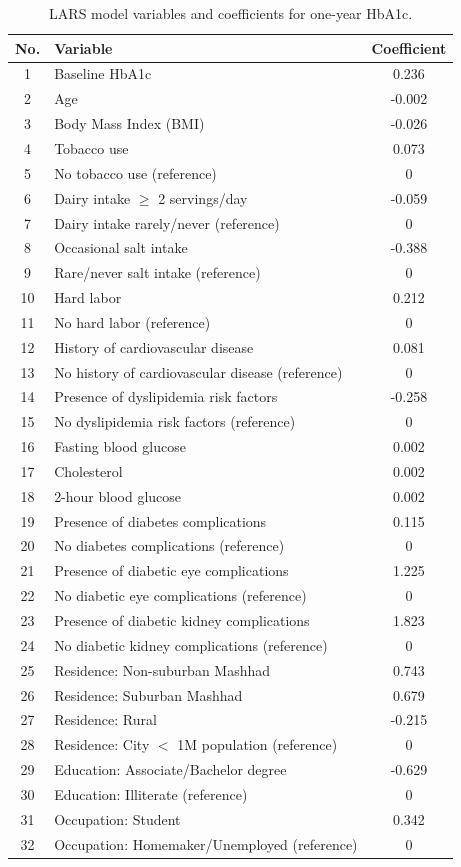 \documentclass[twoside]{article}
\begin{document}
\begin{table}[h]
\begin{center}
\small
\caption{LARS model variables and coefficients for one-year HbA1c.}\label{tab2}

\begin{tabular}{|c|l|c|}
  \hline
  No. & Variable & Coefficient \\  \hline \hline
  1 & Baseline HbA1c & 0.236 \\
  2 & Age & -0.002 \\
  3 & Body Mass Index (BMI) & -0.026 \\
  4 & Tobacco use & 0.073 \\
  5 & No tobacco use (reference) & 0 \\
  6 & Dairy intake $\geq$ 2 servings/day & -0.059 \\
  7 & Dairy intake rarely/never (reference) & 0 \\
  8 & Occasional salt intake & -0.388 \\
  9 & Rare/never salt intake (reference) & 0 \\
  10 & Hard labor & 0.212 \\
  11 & No hard labor (reference) & 0 \\
  12 & History of cardiovascular disease & 0.081 \\
  13 & No history of cardiovascular disease (reference) & 0 \\
  14 & Presence of dyslipidemia risk factors & -0.258 \\
  15 & No dyslipidemia risk factors (reference) & 0 \\
  16 & Fasting blood glucose & 0.002 \\
  17 & Cholesterol & 0.002 \\
  18 & 2-hour blood glucose & 0.002 \\
  19 & Presence of diabetes complications & 0.115 \\
  20 & No diabetes complications (reference) & 0 \\
  21 & Presence of diabetic eye complications & 1.225 \\
  22 & No diabetic eye complications (reference) & 0 \\
  23 & Presence of diabetic kidney complications & 1.823 \\
  24 & No diabetic kidney complications (reference) & 0 \\
  25 & Residence: Non-suburban Mashhad & 0.743 \\
  26 & Residence: Suburban Mashhad & 0.679 \\
  27 & Residence: Rural & -0.215 \\
  28 & Residence: City $<$ 1M population (reference) & 0 \\
  29 & Education: Associate/Bachelor degree & -0.629 \\
  30 & Education: Illiterate (reference) & 0 \\
  31 & Occupation: Student & 0.342 \\
  32 & Occupation: Homemaker/Unemployed (reference) & 0 \\  \hline
\end{tabular}
\end{center}
\end{table}
\end{document}
